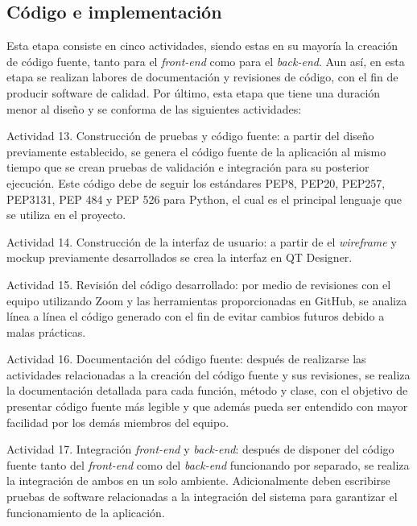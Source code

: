 \subsection{Código e implementación}
Esta etapa consiste en cinco actividades, siendo estas en su mayoría la creación de código fuente, tanto para el \textit{front-end} como para el \textit{back-end}. Aun así, en esta etapa se realizan labores de documentación y revisiones de código, con el fin de producir software de calidad. Por último, esta etapa que tiene una duración menor al diseño y se conforma de las siguientes actividades:

\begin{APAitemize}
    \item Actividad 13. Construcción de pruebas y código fuente: a partir del diseño previamente establecido, se genera el código fuente de la aplicación al mismo tiempo que se crean pruebas de validación e integración para su posterior ejecución. Este código debe de seguir los estándares PEP8, PEP20, PEP257, PEP3131, PEP 484 y PEP 526 para Python, el cual es el principal lenguaje que se utiliza en el proyecto.
    \item Actividad 14. Construcción de la interfaz de usuario: a partir de el \textit{wireframe} y mockup previamente desarrollados se crea la interfaz en QT Designer.
    \item Actividad 15. Revisión del código desarrollado: por medio de revisiones con el equipo utilizando Zoom y las herramientas proporcionadas en GitHub, se analiza línea a línea el código generado con el fin de evitar cambios futuros debido a malas prácticas.
    \item Actividad 16. Documentación del código fuente: después de realizarse las actividades relacionadas a la creación del código fuente y sus revisiones, se realiza la documentación detallada para cada función, método y clase, con el objetivo de presentar código fuente más legible y que además pueda ser entendido con mayor facilidad por los demás miembros del equipo.
    \item Actividad 17. Integración \textit{front-end} y \textit{back-end}: después de disponer del código fuente tanto del \textit{front-end} como del \textit{back-end} funcionando por separado, se realiza la integración de ambos en un solo ambiente. Adicionalmente deben escribirse pruebas de software relacionadas a la integración del sistema para garantizar el funcionamiento de la aplicación.
\end{APAitemize}

